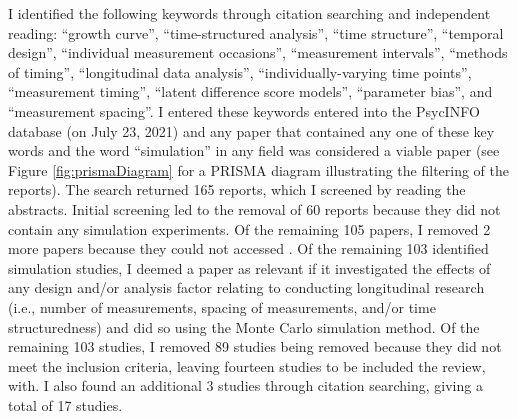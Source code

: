 \documentclass[
12pt, %
twoside,
english]{guelphthesis}
\begin{document}
I identified the following keywords through citation searching and independent reading: ``growth curve'', ``time-structured analysis'', ``time structure'', ``temporal design'', ``individual measurement occasions'', ``measurement intervals'', ``methods of timing'', ``longitudinal data analysis'', ``individually-varying time points'', ``measurement timing'', ``latent difference score models'', ``parameter bias'', and ``measurement spacing''. I entered these keywords entered into the PsycINFO database (on July 23, 2021) and any paper that contained any one of these key words and the word ``simulation'' in any field was considered a viable paper (see Figure \ref{fig:prismaDiagram} for a PRISMA diagram illustrating the filtering of the reports). The search returned 165 reports, which I screened by reading the abstracts. Initial screening led to the removal of 60 reports because they did not contain any simulation experiments. Of the remaining 105 papers, I removed 2 more papers because they could not accessed \autocite{stockdale2007,tiberio2008}. Of the remaining 103 identified simulation studies, I deemed a paper as relevant if it investigated the effects of any design and/or analysis factor relating to conducting longitudinal research (i.e., number of measurements, spacing of measurements, and/or time structuredness) and did so using the Monte Carlo simulation method. Of the remaining 103 studies, I removed 89 studies being removed because they did not meet the inclusion criteria, leaving fourteen studies to be included the review, with. I also found an additional 3 studies through citation searching, giving a total of 17 studies.
\end{document}
